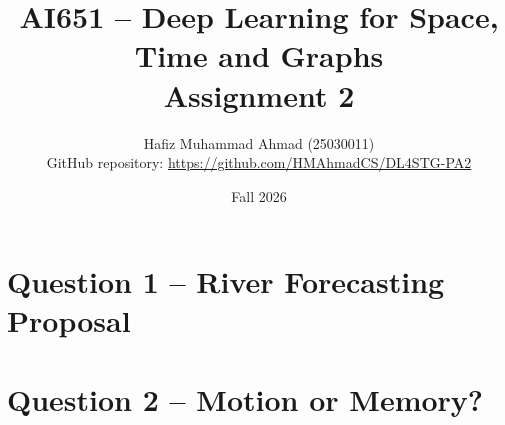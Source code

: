 \documentclass[11pt,a4paper]{article}
\title{AI651 -- Deep Learning for Space, Time and Graphs\\Assignment 2}
\author{Hafiz Muhammad Ahmad (25030011)\\[4pt]
\normalsize GitHub repository: \url{https://github.com/HMAhmadCS/DL4STG-PA2}}
\date{Fall 2026}
\begin{document}
\maketitle
\tableofcontents
\newpage

\part*{Question 1 -- River Forecasting Proposal}







\newpage
\part*{Question 2 -- Motion or Memory?}
\setcounter{section}{0}
\renewcommand{\theHsection}{q2.\arabic{section}}
\renewcommand{\theHtable}{q2.\arabic{table}}
\renewcommand{\theHfigure}{q2.\arabic{figure}}

\end{document}
